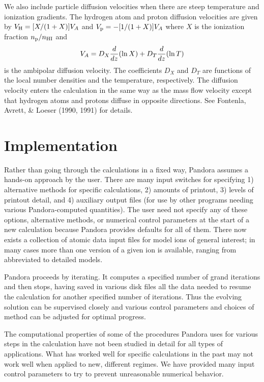 \documentclass[11pt,twoside]{article}
\begin{document}
We also include particle diffusion velocities when
there are steep temperature and ionization gradients. The
hydrogen atom and proton diffusion velocities are given by
$V_{\rm H} = [X/(1+X)]V_A$ and $V_{\rm p} = -[1/(1+X)]V_A$ 
where $X$ is the ionization fraction $n_{\rm p}/n_{\rm HI}$ and
\begin{equation}
 V_A = D_X { d \over d z} (\ln X)
+ D_T { d \over d z} (\ln T) 
\end{equation}
%
is the ambipolar diffusion velocity. The coefficients $D_X$
and $D_T$ are functions of the local number densities and the
temperature, respectively.  The diffusion velocity enters
the calculation in the same way as the mass flow velocity
except that hydrogen atoms and protons diffuse in opposite
directions. See Fontenla, Avrett, \& Loeser (1990, 1991)
for details.


\section{Implementation}

Rather than going through the calculations in a fixed way,
Pandora assumes a hands-on approach by the user. There are
many input switches for specifying 1) alternative methods for
specific calculations, 2) amounts of printout, 3) levels of
printout detail, and 4) auxiliary output files (for use by
other programs needing various Pandora-computed quantities).
The user need not specify any of these options, alternative
methods, or numerical control parameters at the start of a new
calculation because Pandora provides defaults for all of them.
There now exists a collection of atomic data input files for
model ions of general interest; in many cases more than one
version of a given ion is available, ranging from abbreviated
to detailed models.

Pandora proceeds by iterating. It 
computes a specified number of grand iterations and then stops,
having saved in various disk files all the data needed to resume
the calculation for another specified number of iterations.
Thus the evolving solution can be supervised closely and 
various control parameters and choices of method can be
adjusted for optimal progress.

The computational properties of some of the procedures
Pandora uses for various steps in the calculation have not
been studied in detail for all types of applications. What
has worked well for specific calculations in the past may
not work well when applied to new, different regimes. We
have provided many input control parameters to try to
prevent unreasonable numerical behavior.
\end{document}
